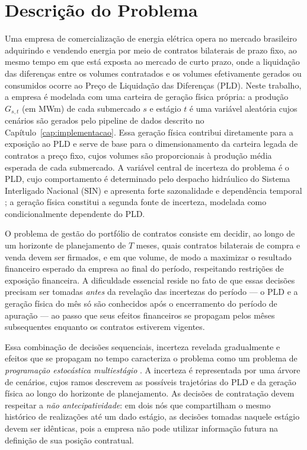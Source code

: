 \section{Descri\c{c}\~ao do Problema}
\label{sec:descricao_problema}

Uma empresa de comercializa\c{c}\~ao de energia el\'etrica opera no mercado brasileiro adquirindo e vendendo energia por meio de contratos bilaterais de prazo fixo, ao mesmo tempo em que est\'a exposta ao mercado de curto prazo, onde a liquida\c{c}\~ao das diferen\c{c}as entre os volumes contratados e os volumes efetivamente gerados ou consumidos ocorre ao Pre\c{c}o de Liquida\c{c}\~ao das Diferen\c{c}as (PLD). Neste trabalho, a empresa \'e modelada com uma carteira de gera\c{c}\~ao f\'isica pr\'opria: a produ\c{c}\~ao $G_{s,t}$ (em MWm) de cada submercado $s$ e est\'agio $t$ \'e uma vari\'avel aleat\'oria cujos cen\'arios s\~ao gerados pelo pipeline de dados descrito no Cap\'itulo~\ref{cap:implementacao}. Essa gera\c{c}\~ao f\'isica contribui diretamente para a exposi\c{c}\~ao ao PLD e serve de base para o dimensionamento da carteira legada de contratos a pre\c{c}o fixo, cujos volumes s\~ao proporcionais \`a produ\c{c}\~ao m\'edia esperada de cada submercado. A vari\'avel central de incerteza do problema \'e o PLD, cujo comportamento \'e determinado pelo despacho hidr\'aulico do Sistema Interligado Nacional (SIN) e apresenta forte sazonalidade e depend\^encia temporal \cite{guerreiro2017}; a gera\c{c}\~ao f\'isica constitui a segunda fonte de incerteza, modelada como condicionalmente dependente do PLD.

O problema de gest\~ao do portf\'olio de contratos consiste em decidir, ao longo de um horizonte de planejamento de $T$ meses, quais contratos bilaterais de compra e venda devem ser firmados, e em que volume, de modo a maximizar o resultado financeiro esperado da empresa ao final do per\'iodo, respeitando restri\c{c}\~oes de exposi\c{c}\~ao financeira. A dificuldade essencial reside no fato de que essas decis\~oes precisam ser tomadas \emph{antes} da revela\c{c}\~ao das incertezas do per\'iodo --- o PLD e a gera\c{c}\~ao f\'isica do m\^es s\'o s\~ao conhecidos ap\'os o encerramento do per\'iodo de apura\c{c}\~ao --- ao passo que seus efeitos financeiros se propagam pelos m\^eses subsequentes enquanto os contratos estiverem vigentes.

Essa combina\c{c}\~ao de decis\~oes sequenciais, incerteza revelada gradualmente e efeitos que se propagam no tempo caracteriza o problema como um problema de \emph{programa\c{c}\~ao estoc\'astica multiestágio} \cite{birge2011}. A incerteza \'e representada por uma \'arvore de cen\'arios, cujos ramos descrevem as poss\'iveis trajet\'orias do PLD e da gera\c{c}\~ao f\'isica ao longo do horizonte de planejamento. As decis\~oes de contrata\c{c}\~ao devem respeitar a \emph{n\~ao antecipatividade}: em dois n\'os que compartilham o mesmo hist\'orico de realiza\c{c}\~oes at\'e um dado est\'agio, as decis\~oes tomadas naquele est\'agio devem ser id\^enticas, pois a empresa n\~ao pode utilizar informa\c{c}\~ao futura na defini\c{c}\~ao de sua posi\c{c}\~ao contratual.

